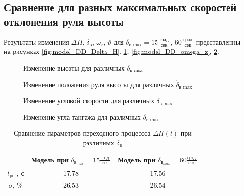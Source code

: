 \subsection{Сравнение для разных максимальных скоростей отклонения руля высоты}

Результаты изменения $\Delta H$, $\delta_{в}$, $\omega_z$, $\vartheta$ для
$\dot{\delta}_\text{в max} = 15\, \frac{\text{град.}}{\text{сек.}},\ 60\, \frac{\text{град.}}{\text{сек.}}$
представленны на рисунках \ref{fig:model_DD_Delta_H},
\ref{fig:model_DD_delta_elevator}, \ref{fig:model_DD_omega_z}, \ref{fig:model_DD_theta}.

\begin{figure}[H]
    \begin{minipage}{0.48\textwidth}
    \centering
    \resizebox{1.1\linewidth}{!}{}
    \caption{Изменение высоты для различных $\dot{\delta}_\text{в max}$}
    \label{fig:model_DD_Delta_H}
    \end{minipage}
    \hfill
    \begin{minipage}{0.48\textwidth}
    \centering
    \resizebox{1.1\linewidth}{!}{}
    \caption{Изменение положения руля высоты для различных $\dot{\delta}_\text{в max}$}
    \label{fig:model_DD_delta_elevator}
    \end{minipage}
\end{figure}

\begin{figure}[H]
    \begin{minipage}{0.48\textwidth}
    \centering
    \resizebox{1.1\linewidth}{!}{}
    \caption{Изменение угловой скорости для различных $\dot{\delta}_\text{в max}$}
    \label{fig:model_DD_omega_z}
    \end{minipage}
    \hfill
    \begin{minipage}{0.48\textwidth}
    \centering
    \resizebox{1.1\linewidth}{!}{}
    \caption{Изменение угла тангажа для различных $\dot{\delta}_\text{в max}$}
    \label{fig:model_DD_theta}
\end{minipage}
\end{figure}

\begin{table}[H]
    \centering
    \caption{Сравнение параметров переходного процессса $\Delta H(t)$ при различных $\dot{\delta}_{в}$}
    \label{tab:stat_DD}

    \begin{tabular}{|c|c|c|}
    \hline
    {} &  Модель при $\dot{\delta}_{{в}_{max}}=15 \frac{град.}{сек.}$ &  Модель при $\dot{\delta}_{{в}_{max}}=60 \frac{град.}{сек.}$ \\
    \hline
    $t_{рег},\ с$ &                                              17.78 &                                              17.56 \\
    \hline
    $\sigma,\ \%$ &                                              26.53 &                                              26.54 \\
    \hline
    \end{tabular}
\end{table}
